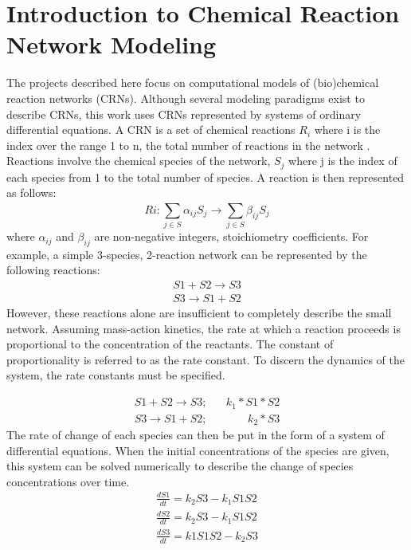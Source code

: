 \documentclass[12pt]{report}
\begin{document}
\section{Introduction to Chemical Reaction Network Modeling}
\label{section:intro_crn}
The projects described here focus on computational models of (bio)chemical reaction networks (CRNs). Although several modeling paradigms exist to describe CRNs, this work uses CRNs represented by systems of ordinary differential equations. A CRN is a set of chemical reactions $R_i$ where i is the index over the range 1 to n, the total number of reactions in the network . Reactions involve the chemical species of the network, $S_j$ where j is the index of each species from 1 to the total number of species. A reaction is then represented as follows:
\begin{equation*}
Ri: \sum_{j\in S}^{}\alpha_{ij}S_j\to \sum_{j\in S}^{}\beta_{ij}S_j
\end{equation*}
where $\alpha_{ij}$ and $\beta_{ij}$ are non-negative integers, stoichiometry coefficients. For example, a simple 3-species, 2-reaction network can be represented by the following reactions:
\begin{equation}
\begin{split}
S1 + S2 \to S3 \\
S3 \to S1 + S2
\end{split}
\end{equation}
However, these reactions alone are insufficient to completely describe the small network.  Assuming mass-action kinetics, the rate at which a reaction proceeds is proportional to the concentration of the reactants. The constant of proportionality is referred to as the rate constant. To discern the dynamics of the system, the rate constants must be specified.

\begin{equation}
\begin{split}
S1 + S2 \to S3; \;\;\;\;\;\; k_1*S1*S2\\
S3 \to S1 + S2; \;\;\;\;\;\;\;\;\;\;\;\;\; k_2*S3
\end{split}
\end{equation}
The rate of change of each species can then be put in the form of a system of differential equations. When the initial concentrations of the species are given, this system can be solved numerically to describe the change of species concentrations over time.
\begin{equation}
\begin{split}
\frac{dS1}{dt}=k_2S3 - k_1S1S2\\
\frac{dS2}{dt}=k_2S3 -k_1S1S2\\
\frac{dS3}{dt}=k1S1S2 - k_2S3
\end{split}
\end{equation}
\end{document}
